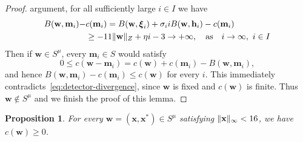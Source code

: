 \documentclass[11pt,a4paper]{article}
\theoremstyle{reportstyle}
\newtheorem{proposition}[lemma]{Proposition}
\numberwithin{equation}{section}
\newcommand{\bx}{\mathbf x}
\newcommand{\bm}{\mathbf m}
\newcommand{\bw}{\mathbf w}
\newcommand{\bh}{\mathbf h}
\newcommand{\bxi}{\boldsymbol\xi}
\DeclarePairedDelimiter{\norm}{\lVert}{\rVert}
\begin{document}
\begin{proof}
		argument, for all sufficiently large $i\in I$ we have
		\begin{equation}
			\begin{aligned}
				B(\bw,\bm_i) - & c(\bm_i) = B(\bw,\bxi_i) + \sigma_i iB(\bw,\bh_i)-c(\bm_i)\\
				&\ge -11\norm{\bw}_Z+\eta i-3 \to +\infty,\quad\mbox{as}\quad i\to\infty,\ i\in I
			\end{aligned}
			\label{eq:detector-divergence}
		\end{equation}
		Then if $\bw\in S^\mu$, every $\bm_i\in S$ would satisfy
		$$ 0\le c(\bw - \bm_i) = c(\bw) + c(\bm_i) -B(\bw,\bm_i), $$
		and hence $B(\bw,\bm_i)-c(\bm_i)\le c(\bw)$ for every $i$.
		This immediately contradicts~\eqref{eq:detector-divergence}, since $\bw$ is fixed and
		$c(\bw)$ is finite. Thus $\bw\notin S^\mu$ and we finish the proof of this lemma.
	\end{proof}

	\begin{proposition}
		\label{prop:local-energy}
		For every $\bw=(\bx,\bx^*)\in S^\mu$ satisfying $\norm{\bx}_\infty<16$, we have $c(\bw)\ge0$.
	\end{proposition}
\end{document}
